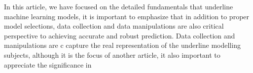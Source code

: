 
\par
In this article, we have focused on the detailed fundamentals that underline machine learning models, it is important to emphasize that in addition to proper model selections, data collection and data manipulations are also critical perspective to achieving accurate and robust prediction. Data collection and manipulations are c capture the real representation of the underline modelling subjects, although it is the focus of another article, it also important to appreciate the significance in 
\par 
